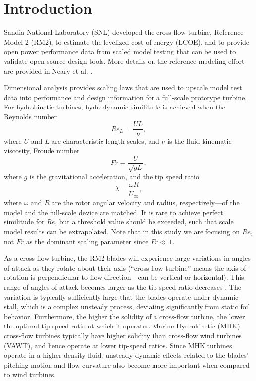 \documentclass[12pt,letterpaper]{scrreprt}
\begin{document}
\tableofcontents

\newpage
\listoftodos

\chapter{Introduction}

Sandia National Laboratory (SNL) developed the cross-flow turbine, Reference
Model 2 (RM2), to estimate the levelized cost of energy (LCOE), and to provide
open power performance data from scaled model testing that can be used to
validate open-source design tools.  More details on the reference modeling
effort are provided in Neary et al. \cite{Neary2014}.

Dimensional analysis provides scaling laws that are used to upscale model test
data into performance and design information for a full-scale prototype turbine.
For hydrokinetic turbines, hydrodynamic similitude is achieved when the Reynolds
number
\begin{equation}
Re_L = \frac{UL}{\nu},
\label{eq-Re}
\end{equation}
where $U$ and $L$ are characteristic length scales, and $\nu$ is the fluid
kinematic viscosity, Froude number
\begin{equation}
Fr = \frac{U}{\sqrt{gL}},
\label{eq-Fr}
\end{equation}
where $g$ is the gravitational acceleration, and the tip speed ratio
\begin{equation}
\lambda=\frac{\omega R}{U_\infty},
\end{equation}
where $\omega$ and $R$ are the rotor angular velocity and radius,
respectively---of the model and the full-scale device are matched. It is rare to
achieve perfect similitude for $Re$, but a threshold value should be exceeded,
such that scale model results can be extrapolated. Note that in this study we
are focusing on $Re$, not $Fr$ as the dominant scaling parameter since $Fr \ll
1$.

As a cross-flow turbine, the RM2 blades will experience large variations in
angles of attack as they rotate about their axis (``cross-flow turbine'' means
the axis of rotation is perpendicular to flow direction---can be vertical or
horizontal). This range of angles of attack becomes larger as the tip speed
ratio decreases \cite{Para2002}. The variation is typically sufficiently large
that the blades operate under dynamic stall, which is a complex unsteady
process, deviating significantly from static foil behavior. Furthermore, the
higher the solidity of a cross-flow turbine, the lower the optimal tip-speed
ratio at which it operates. Marine Hydrokinetic (MHK) cross-flow turbines
typically have higher solidity than cross-flow wind turbines (VAWT), and hence
operate at lower tip-speed ratios. Since MHK turbines operate in a higher
density fluid, unsteady dynamic effects related to the blades' pitching motion
and flow curvature also become more important when compared to wind turbines.
\end{document}
